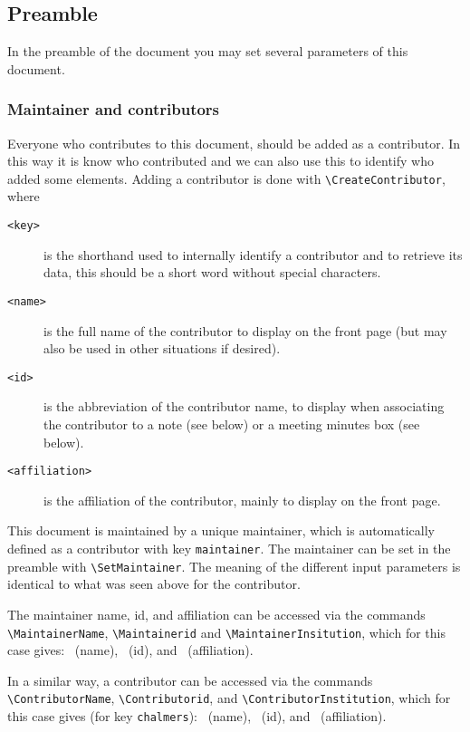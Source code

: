 \documentclass{project-logbook}
\begin{document}
	\subsection{Preamble}
		In the preamble of the document you may set several parameters of this document.

		\subsubsection{Maintainer and contributors}
			Everyone who contributes to this document, should be added as a contributor. In this way it is know who contributed and we can also use this to identify who added some elements. Adding a contributor is done with \texttt{\textbackslash CreateContributor}, where
			\begin{description}
				\item[\texttt{<key>}] is the shorthand used to internally identify a contributor and to retrieve its data, this should be a short word without special characters.
				\item[\texttt{<name>}] is the full name of the contributor to display on the front page (but may also be used in other situations if desired).
				\item[\texttt{<id>}] is the abbreviation of the contributor name, to display when associating the contributor to a note (see below) or a meeting minutes box (see below).
				\item[\texttt{<affiliation>}] is the affiliation of the contributor, mainly to display on the front page.
    			\end{description}

			This document is maintained by a unique maintainer, which is automatically defined as a contributor with key \texttt{maintainer}. The maintainer can be set in the preamble with  \texttt{\textbackslash SetMaintainer}. The meaning of the different input parameters is identical to what was seen above for the contributor.

			The maintainer name, id, and affiliation can be accessed via the commands \texttt{\textbackslash MaintainerName}, \texttt{\textbackslash Maintainerid} and \texttt{\textbackslash MaintainerInsitution}, which for this case gives: \MaintainerName~(name), \Maintainerid~(id), and \MaintainerInstitution~(affiliation).

			In a similar way, a contributor can be accessed via the commands \texttt{\textbackslash ContributorName}, \texttt{\textbackslash Contributorid}, and \texttt{\textbackslash ContributorInstitution}, which for this case gives (for key \texttt{chalmers}):  ~(name), ~(id), and ~(affiliation).
\end{document}
